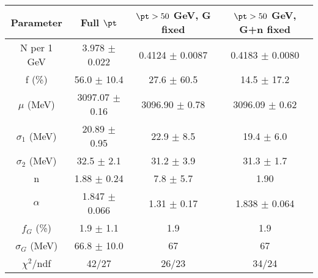 \begin{tabular}{c||c|c|c}
Parameter & Full $\pt$ & $\pt>50$ GeV, G fixed & $\pt>50$ GeV, G+n fixed \\
\hline
N per 1 GeV & 3.978 $\pm$ 0.022 & 0.4124 $\pm$ 0.0087 & 0.4183 $\pm$ 0.0080\\
f (\%) & 56.0 $\pm$ 10.4 & 27.6 $\pm$ 60.5 & 14.5 $\pm$ 17.2\\
$\mu$ (MeV) & 3097.07 $\pm$ 0.16 & 3096.90 $\pm$ 0.78 & 3096.09 $\pm$ 0.62\\
$\sigma_1$ (MeV) & 20.89 $\pm$ 0.95 & 22.9 $\pm$ 8.5 & 19.4 $\pm$ 6.0\\
$\sigma_2$ (MeV) & 32.5 $\pm$ 2.1 & 31.2 $\pm$ 3.9 & 31.3 $\pm$ 1.7\\
n & 1.88 $\pm$ 0.24 & 7.8 $\pm$ 5.7 & 1.90\\
$\alpha$ & 1.847 $\pm$ 0.066 & 1.31 $\pm$ 0.17 & 1.838 $\pm$ 0.064\\
$f_G$ (\%) & 1.9 $\pm$ 1.1 & 1.9 & 1.9\\
$\sigma_G$ (MeV) & 66.8 $\pm$ 10.0 & 67 & 67\\
\hline
$\chi^2$/ndf & 42/27 & 26/23 & 34/24\\
\end{tabular}
